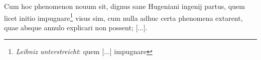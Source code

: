 \pend \pstart [p.~49] Cum hoc phenomenon nouum sit, dignus sane Hugeniani ingenij partus, quem licet initio impugnare\footnote{\textit{Leibniz unterstreicht}: quem [...] impugnare} visus sim, cum nulla adhuc certa phenomena extarent, quae absque annulo explicari non possent; [...].
